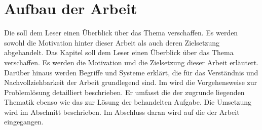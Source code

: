 \section{Aufbau der Arbeit}{Die  soll dem Leser einen Überblick über das Thema verschaffen. Es werden sowohl die Motivation hinter dieser Arbeit als auch deren Zielsetzung abgehandelt. Das Kapitel  soll dem Leser einen Überblick über das Thema verschaffen. Es werden die Motivation und die Zielsetzung dieser Arbeit erläutert. Darüber hinaus werden Begriffe und Systeme erklärt, die für das Verständnis und Nachvollziehbarkeit der Arbeit grundlegend sind. Im  wird die Vorgehensweise zur Problemlösung detailliert beschrieben. Er umfasst die  der zugrunde liegenden Thematik ebenso wie das  zur Lösung der behandelten Aufgabe. Die Umsetzung wird im Abschnitt  beschrieben. Im Abschluss daran wird auf die  der Arbeit eingegangen. 
}
